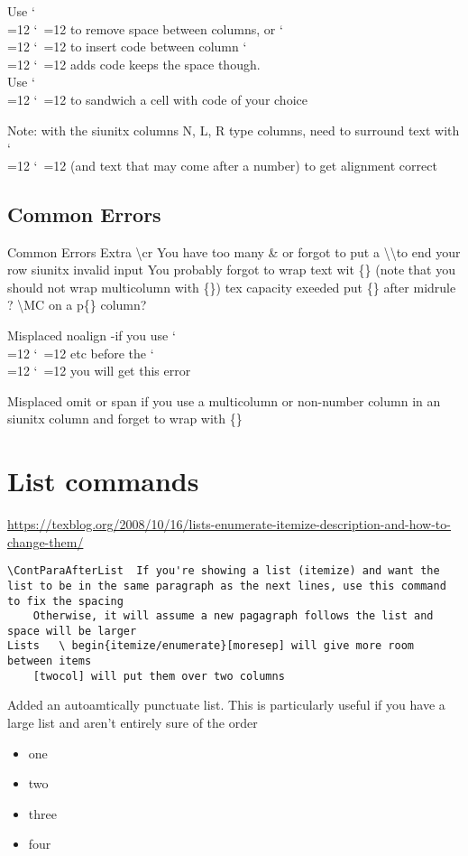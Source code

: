 \documentclass{\FormatDir corpboreportMulti}
\def\cmd{\bgroup\catcode`\\=12 \catcode`\ =12 \cmdA}
\def\cmdA#1{\egroup{\texttt{\detokenize{#1}}}}
\begin{document}
Use \cmd{@{}} to remove space between columns, or \cmd{@{'code'}} to insert code between column
\cmd{!{code}} adds code keeps the space though.\\
Use \cmd{>{'code'} <{'code'}} to sandwich a cell with code of your choice

Note: with the siunitx columns N, L, R type columns, need to surround text with \cmd{{}} (and text that may come after a number) to get alignment correct

	


\subsection{Common Errors}
Common Errors
	Extra \textbackslash cr	You have too many \& or forgot to put a \textbackslash\textbackslash to end your row
	siunitx invalid input	You probably forgot to wrap text wit \{\}  (note that you should not wrap multicolumn with \{\})
	tex capacity exeeded	put \{\} after midrule ?
	\textbackslash MC on a p\{\} column?

Misplaced noalign -if you use \cmd{\midrule} etc before the \cmd{\\} you will get this error

Misplaced omit or span if you use a multicolumn or non-number column in an siunitx column and
forget to wrap with \{\}

\section{List commands}
\url{https://texblog.org/2008/10/16/lists-enumerate-itemize-description-and-how-to-change-them/}

\begin{lstlisting}
\ContParaAfterList	If you're showing a list (itemize) and want the list to be in the same paragraph as the next lines, use this command to fix the spacing
	Otherwise, it will assume a new pagagraph follows the list and space will be larger
Lists	\ begin{itemize/enumerate}[moresep] will give more room between items
	[twocol] will put them over two columns

\end{lstlisting}

	Added an autoamtically punctuate list. This is particularly useful if you have a large list and aren't entirely sure of the order

\begin{itemize}[autopunc]
	\item one
	\item two
	\item three
	\item four
\end{itemize}
\end{document}
